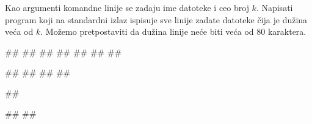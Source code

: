 \begin{Exercise}[label=p3_03] 
 Kao argumenti komandne linije se zadaju ime datoteke i ceo broj $k$. Napisati program koji na  standardni izlaz ispisuje sve linije zadate datoteke čija je dužina veća od $k$. Možemo pretpostaviti da dužina linije neće biti veća od $80$ karaktera.\\
\begin{miditest}
\begin{upotreba}{1}
##
##
##
##
##
##
##

#\naslovIzlaz#
##
##
##
\end{upotreba}
\end{miditest}
\begin{miditest}
\begin{upotreba}{2}
##

#\naslovIzlaz#
##
\end{upotreba}
\end{miditest}
\end{Exercise}
\begin{Answer}[ref=p3_03]
\end{Answer}

